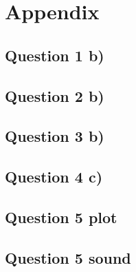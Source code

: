 \documentclass{article}
\newenvironment{homeworkProblem}[1]{
	\section*{#1}
	}{
}
\newenvironment{homeworkSection}[1]{
	\subsection*{#1}
	}{
}
\begin{document}
\newpage
\begin{homeworkProblem}{Appendix}

\begin{homeworkSection}{Question 1 b)}
	
\end{homeworkSection}

\begin{homeworkSection}{Question 2 b)}
	
\end{homeworkSection}

\newpage
\begin{homeworkSection}{Question 3 b)}
	
\end{homeworkSection}

\begin{homeworkSection}{Question 4 c)}
	
\end{homeworkSection}

\newpage
\begin{homeworkSection}{Question 5 plot}
	
\end{homeworkSection}

\begin{homeworkSection}{Question 5 sound}
	
\end{homeworkSection}

\end{homeworkProblem}

\end{document}

